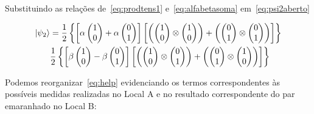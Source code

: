 Substituindo as relações de~\eqref{eq:prodtens1} e~\eqref{eq:alfabetasoma} em~\eqref{eq:psi2aberto}


\begin{align}\label{eq:help}
\ket{\psi_2} &= \frac{1}{2}\left\{\left[\alpha\begin{pmatrix}
1 \\
0
\end{pmatrix}+\alpha\begin{pmatrix}
0 \\
1
\end{pmatrix}\right]\left[\left(\begin{pmatrix}
1 \\
0
\end{pmatrix} \otimes \begin{pmatrix}
1 \\
0
\end{pmatrix}\right) + \left(\begin{pmatrix}
0 \\
1
\end{pmatrix} \otimes \begin{pmatrix}
0 \\
1
\end{pmatrix}\right)\right]\right\} \nonumber \\
&\frac{1}{2}\left\{\left[\beta\begin{pmatrix}
1 \\
0
\end{pmatrix}-\beta\begin{pmatrix}
0 \\
1
\end{pmatrix}\right]\left[\left(\begin{pmatrix}
1 \\
0
\end{pmatrix} \otimes \begin{pmatrix}
0 \\
1
\end{pmatrix}\right) + \left(\begin{pmatrix}
0 \\
1
\end{pmatrix} \otimes \begin{pmatrix}
1 \\
0
\end{pmatrix}\right)\right]\right\}
\end{align}

Podemos reorganizar~\eqref{eq:help} evidenciando os termos correspondentes às possíveis medidas realizadas no Local A e no resultado correspondente do par emaranhado no Local B:

